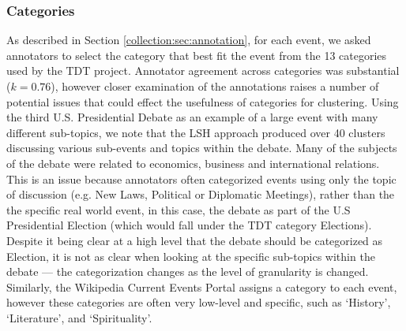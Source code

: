 \subsubsection{Categories}
As described in Section \ref{collection:sec:annotation}, for each event, we asked annotators to select the category that best fit the event from the 13 categories used by the TDT project.
Annotator agreement across categories was substantial (\(k = 0.76\)), however closer examination of the annotations raises a number of potential issues that could effect the usefulness of categories for clustering.
Using the third U.S. Presidential Debate as an example of a large event with many different sub-topics, we note that the LSH approach produced over 40 clusters discussing various sub-events and topics within the debate.
Many of the subjects of the debate were related to economics, business and international relations.
This is an issue because annotators often categorized events using only the topic of discussion (e.g. New Laws, Political or Diplomatic Meetings), rather than the the specific real world event, in this case, the debate as part of the U.S Presidential Election (which would fall under the TDT category Elections).
Despite it being clear at a high level that the debate should be categorized as Election, it is not as clear when looking at the specific sub-topics within the debate --- the categorization changes as the level of granularity is changed.
Similarly, the Wikipedia Current Events Portal assigns a category to each event, however these categories are often very low-level and specific, such as `History', `Literature', and `Spirituality'.

